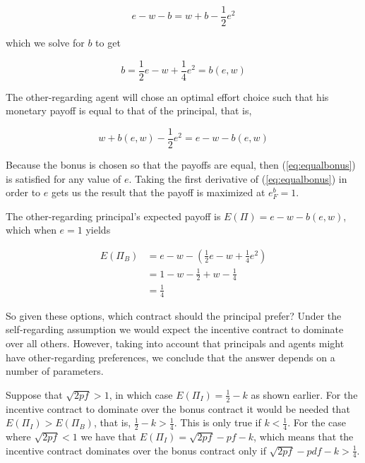 \documentclass[12pt]{article}
\begin{document}
\begin{equation}
e - w - b = w + b - \frac{1}{2} e^2
\end{equation} 

\noindent
which we solve for $b$ to get

\begin{equation}
	b = \frac{1}{2} e - w + \frac{1}{4}e^2 = b\left(e,w\right)
\end{equation}

The other-regarding agent will chose an optimal effort choice such that his monetary payoff is equal to that of the principal, that is, 

\begin{equation}\label{eq:equalbonus}
	w + b(e,w) - \frac{1}{2}e^2 = e - w - b(e,w)
\end{equation}

Because the bonus is chosen so that the payoffs are equal, then (\ref{eq:equalbonus}) is satisfied for any value of $e$. Taking the first derivative of (\ref{eq:equalbonus}) in order to $e$ gets us the result that the payoff is maximized at $e^b_F = 1$. 

The other-regarding principal's expected payoff is $E\left(\Pi\right) = e - w - b(e,w)$, which when $e=1$ yields

\begin{equation}
\begin{split}
E\left(\Pi_B\right) & = e - w - \left( \frac{1}{2}e - w + \frac{1}{4}e^2 \right)\\
& = 1 - w - \frac{1}{2} + w - \frac{1}{4}\\
& = \frac{1}{4} 
\end{split}
\end{equation}

So given these options, which contract should the principal prefer? Under the self-regarding assumption we would expect the incentive contract to dominate over all others. However, taking into account that principals and agents might have other-regarding preferences, we conclude that the answer depends on a number of parameters. 

Suppose that $\sqrt{2pf} > 1$, in which case $E\left(\Pi_I\right) = \frac{1}{2} - k$ as shown earlier. For the incentive contract to dominate over the bonus contract it would be needed that $E\left(\Pi_I\right) > E\left(\Pi_B\right)$, that is, $\frac{1}{2} - k > \frac{1}{4}$. This is only true if $ k < \frac{1}{4}$. For the case where $\sqrt{2pf}<1$ we have that $E\left(\Pi_I\right) = \sqrt{2pf} - pf - k$, which means that the incentive contract dominates over the bonus contract only if $\sqrt{2pf} - pdf - k >\frac{1}{4}$.
\end{document}
